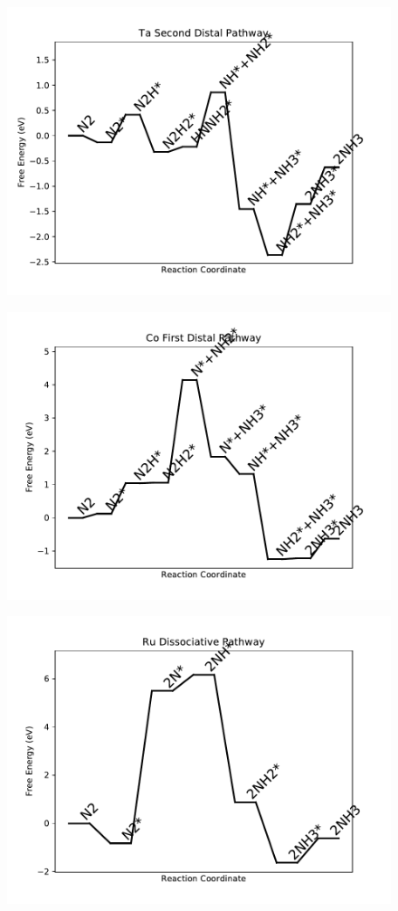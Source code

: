 \begin{figure}
\includegraphics[width=0.8\linewidth]{data/plots/Ta_distal_2.pdf}
\end{figure}

\begin{figure}
\includegraphics[width=0.8\linewidth]{data/plots/Co_distal_1.pdf}
\end{figure}

\begin{figure}
\includegraphics[width=0.8\linewidth]{data/plots/Ru_dissociative.pdf}
\end{figure}

